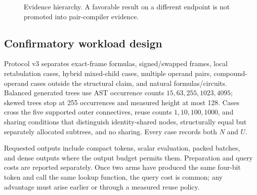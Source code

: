 \documentclass[10pt]{article}
\theoremstyle{plain}
\theoremstyle{definition}
\theoremstyle{remark}
\begin{document}
\begin{figure}[H]
\centering
{}
\caption{Evidence hierarchy. A favorable result on a different endpoint is not promoted into pair-compiler evidence.}
\label{fig:evidence-levels}
\end{figure}

\subsection{Confirmatory workload design}

Protocol v3 separates exact-frame formulas, signed/swapped frames, local retabulation cases, hybrid mixed-child cases, multiple operand pairs, compound-operand cases outside the structural claim, and natural formulas/circuits. Balanced generated trees use AST occurrence counts $15,63,255,1023,4095$; skewed trees stop at 255 occurrences and measured height at most 128. Cases cross the five supported outer connectives, reuse counts $1,10,100,1000$, and sharing conditions that distinguish identity-shared nodes, structurally equal but separately allocated subtrees, and no sharing. Every case records both $N$ and $U$.

Requested outputs include compact tokens, scalar evaluation, packed batches, and dense outputs where the output budget permits them. Preparation and query costs are reported separately. Once two arms have produced the same four-bit token and call the same lookup function, the query cost is common; any advantage must arise earlier or through a measured reuse policy.
\end{document}
